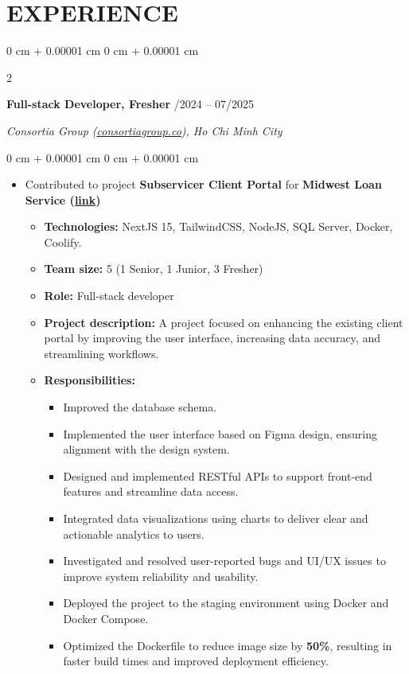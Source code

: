 \documentclass[10pt, letterpaper]{article}
\newenvironment{highlights}{
    \begin{itemize}[
        topsep=0.10 cm,
        parsep=0.10 cm,
        partopsep=0pt,
        itemsep=0pt,
        leftmargin=0 cm + 10pt
    ]
}{
    \end{itemize}
} %
\newenvironment{onecolentry}{
    \begin{adjustwidth}{
        0 cm + 0.00001 cm
    }{
        0 cm + 0.00001 cm
    }
}{
    \end{adjustwidth}
} %
\newenvironment{twocolentry}[2][]{
    \onecolentry
    \def\secondColumn{#2}
    \setcolumnwidth{\fill, 4.5 cm}
    \begin{paracol}{2}
}{
    \switchcolumn \raggedleft \secondColumn
    \end{paracol}
    \endonecolentry
} %
\begin{document}
    \section{EXPERIENCE}       
        \begin{twocolentry}{
            11/2024 – 07/2025
        }
            \textbf{Full-stack Developer, Fresher}\end{twocolentry}
        \vspace{0.10 cm}
        \par{\textit{Consortia Group (\href{https://consortiagroup.co/}{consortiagroup.co}), Ho Chi Minh City}}
        \vspace{0.10 cm}
        \begin{onecolentry}
            \begin{highlights}
                \item Contributed to project {\bf Subservicer Client Portal} for {\bf Midwest Loan Service (\href{https://www.midwestloanservices.com/}{link})}
                \begin{itemize}
                    \item {\bf Technologies:} NextJS 15, TailwindCSS, NodeJS, SQL Server, Docker, Coolify.
                    \item {\bf Team size:} 5 (1 Senior, 1 Junior, 3 Fresher)
                    \item {\bf Role:} Full-stack developer
                    \item {\bf Project description:} A project focused on enhancing the existing client portal by improving the user interface, increasing data accuracy, and streamlining workflows.
                    \item {\bf Responsibilities:}
                    \begin{itemize}
                        \item Improved the database schema.
                        \item Implemented the user interface based on Figma design, ensuring alignment with the design system.
                        \item Designed and implemented RESTful APIs to support front-end features and streamline data access.
                        \item Integrated data visualizations using charts to deliver clear and actionable analytics to users.
                        \item Investigated and resolved user-reported bugs and UI/UX issues to improve system reliability and usability.
                        \item Deployed the project to the staging environment using Docker and Docker Compose.
                        \item Optimized the Dockerfile to reduce image size by {\bf 50\%}, resulting in faster build times and improved deployment efficiency.
                    \end{itemize}
                \end{itemize}
            \end{highlights}
        \end{onecolentry}
\end{document}

